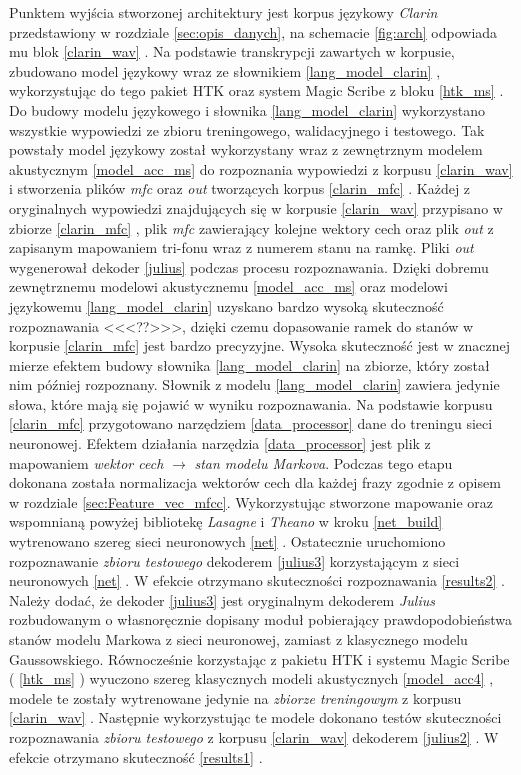 \documentclass[11pt]{article}
\newcommand{\refBlock}[1]{
	\hyperref[#1]{\ref*{#1}}
}
\begin{document}
	Punktem wyjścia stworzonej architektury jest korpus językowy \textit{Clarin} przedstawiony w rozdziale \ref{sec:opis_danych}, na schemacie \ref{fig:arch} odpowiada mu blok \refBlock{clarin_wav}. Na podstawie transkrypcji zawartych w korpusie, zbudowano model językowy wraz ze słownikiem \refBlock{lang_model_clarin}, wykorzystując do tego pakiet HTK oraz system Magic Scribe z bloku \refBlock{htk_ms}. Do budowy modelu językowego i słownika \refBlock{lang_model_clarin} wykorzystano wszystkie wypowiedzi ze zbioru treningowego, walidacyjnego i testowego. Tak powstały model językowy został wykorzystany wraz z zewnętrznym modelem akustycznym \refBlock{model_acc_ms} do rozpoznania wypowiedzi z korpusu \refBlock{clarin_wav} i stworzenia plików \textit{mfc} oraz \textit{out} tworzących korpus \refBlock{clarin_mfc}. Każdej z oryginalnych wypowiedzi znajdujących się w korpusie \refBlock{clarin_wav} przypisano w zbiorze \refBlock{clarin_mfc}, plik \textit{mfc} zawierający kolejne wektory cech oraz plik \textit{out} z zapisanym mapowaniem tri-fonu wraz z numerem stanu na ramkę. Pliki \textit{out} wygenerował dekoder \refBlock{julius} podczas procesu rozpoznawania. Dzięki dobremu zewnętrznemu  modelowi akustycznemu \refBlock{model_acc_ms} oraz modelowi językowemu \refBlock{lang_model_clarin} uzyskano bardzo wysoką skuteczność rozpoznawania <<<??>>>, dzięki czemu dopasowanie ramek do stanów w korpusie \refBlock{clarin_mfc} jest bardzo precyzyjne. Wysoka skuteczność jest w znacznej mierze efektem budowy słownika \refBlock{lang_model_clarin} na zbiorze, który został nim później rozpoznany. Słownik z modelu \refBlock{lang_model_clarin} zawiera jedynie słowa, które mają się pojawić w wyniku rozpoznawania. Na podstawie korpusu \refBlock{clarin_mfc} przygotowano narzędziem \refBlock{data_processor} dane do treningu sieci neuronowej. Efektem działania narzędzia \refBlock{data_processor} jest plik z mapowaniem \textit{wektor cech} $\longrightarrow$ \textit{stan modelu Markova}. Podczas tego etapu dokonana została normalizacja wektorów cech dla każdej frazy zgodnie z opisem w rozdziale \ref{sec:Feature_vec_mfcc}. Wykorzystując stworzone mapowanie oraz wspomnianą powyżej bibliotekę \textit{Lasagne} i \textit{Theano} w kroku \refBlock{net_build} wytrenowano szereg sieci neuronowych \refBlock{net}. Ostatecznie uruchomiono rozpoznawanie \textit{zbioru testowego} dekoderem \refBlock{julius3} korzystającym z sieci neuronowych \refBlock{net}. W efekcie otrzymano skuteczności rozpoznawania \refBlock{results2}. Należy dodać, że dekoder \refBlock{julius3} jest oryginalnym dekoderem \textit{Julius} rozbudowanym o własnoręcznie dopisany moduł pobierający prawdopodobieństwa stanów modelu Markowa z sieci neuronowej, zamiast z klasycznego modelu Gaussowskiego. Równocześnie korzystając z pakietu HTK i systemu Magic Scribe (\refBlock{htk_ms}) wyuczono szereg klasycznych modeli akustycznych \refBlock{model_acc4}, modele te zostały wytrenowane jedynie na \textit{zbiorze treningowym} z korpusu \refBlock{clarin_wav}. Następnie wykorzystując te modele dokonano testów skuteczności rozpoznawania \textit{zbioru testowego} z korpusu \refBlock{clarin_wav} dekoderem \refBlock{julius2}. W efekcie otrzymano skuteczność \refBlock{results1}.
	
\end{document}
